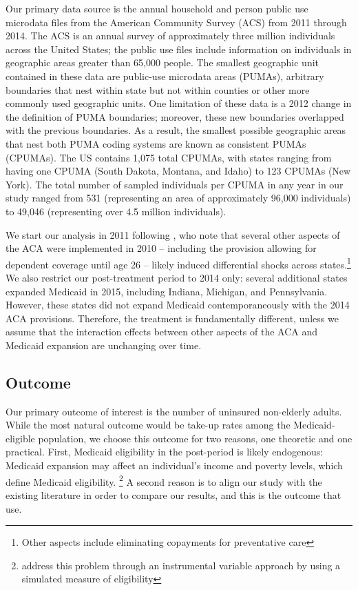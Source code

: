 \documentclass[final]{article}
\begin{document}
Our primary data source is the annual household and person public use microdata files from the American Community Survey (ACS) from 2011 through 2014. The ACS is an annual survey of approximately three million individuals across the United States; the public use files include information on individuals in geographic areas greater than 65,000 people. The smallest geographic unit contained in these data are public-use microdata areas (PUMAs), arbitrary boundaries that nest within state but not within counties or other more commonly used geographic units. One limitation of these data is a 2012 change in the definition of PUMA boundaries; moreover, these new boundaries overlapped with the previous boundaries. As a result, the smallest possible geographic areas that nest both PUMA coding systems are known as consistent PUMAs (CPUMAs). The US contains 1,075 total CPUMAs, with states ranging from having one CPUMA (South Dakota, Montana, and Idaho) to 123 CPUMAs (New York). The total number of sampled individuals per CPUMA in any year in our study ranged from 531 (representing an area of approximately 96,000 individuals) to 49,046 (representing over 4.5 million individuals). 

We start our analysis in 2011 following \cite{courtemanche2017early}, who note that several other aspects of the ACA were implemented in 2010 -- including the provision allowing for dependent coverage until age 26 -- likely induced differential shocks across states.\footnote{Other aspects include eliminating copayments for preventative care} We also restrict our post-treatment period to 2014 only: several additional states expanded Medicaid in 2015, including Indiana, Michigan, and Pennsylvania. However, these states did not expand Medicaid contemporaneously with the 2014 ACA provisions. Therefore, the treatment is fundamentally different, unless we assume that the interaction effects between other aspects of the ACA and Medicaid expansion are unchanging over time. 

\subsection{Outcome}

Our primary outcome of interest is the number of uninsured non-elderly adults. While the most natural outcome would be take-up rates among the Medicaid-eligible population, we choose this outcome for two reasons, one theoretic and one practical. First, Medicaid eligibility in the post-period is likely endogenous: Medicaid expansion may affect an individual's income and poverty levels, which define Medicaid eligibility. \footnote{\cite{frean2017premium} address this problem through an instrumental variable approach by using a simulated measure of eligibility} A second reason is to align our study with the existing literature in order to compare our results, and this is the outcome that \cite{courtemanche2017early} use. 
\end{document}
